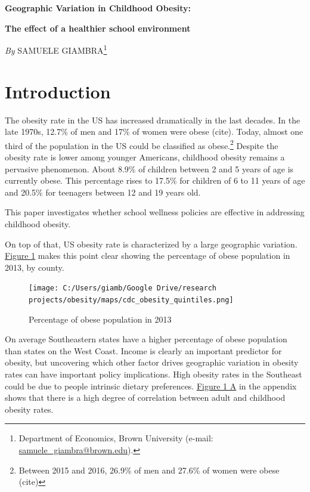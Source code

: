 \documentclass[twoside,12pt]{article}
\renewcommand*{\thefootnote}{\fnsymbol{footnote}}		%
\begin{document}
\thispagestyle{firststyle}

\centerline{\Large{\textbf{Geographic Variation in Childhood Obesity:}}} 
\vspace{2mm}
\centerline{\large{\textbf{The effect of a healthier school environment}}} 

\vspace{5mm}

\centerline{\textit{By} SAMUELE GIAMBRA\footnote{Department of Economics, Brown University (e-mail: \href{mailto:samuele_giambra@brown.edu}{samuele\_giambra@brown.edu}).}} 


\vspace{8mm}
\renewcommand*{\thefootnote}{\arabic{footnote}}		%
\setcounter{footnote}{0}




\section{Introduction}
The obesity rate in the US has increased dramatically in the last decades. In the late 1970s, 12.7\% of men and 17\% of women were obese (cite). Today, almost one third of the population in the US could be classified as obese.\footnote{Between 2015 and 2016, 26.9\% of men and 27.6\% of women were obese (cite)} Despite the obesity rate is lower among younger Americans, childhood obesity remains a pervasive phenomenon. About 8.9\% of children between 2 and 5 years of age is currently obese. This percentage rises to 17.5\% for children of 6 to 11 years of age and 20.5\% for teenagers between 12 and 19 years old.  

This paper investigates whether school wellness policies are effective in addressing childhood obesity. 


On top of that, US obesity rate is characterized by a large geographic variation. \hyperref[cdc_obesity]{Figure 1} makes this point clear showing the percentage of obese population in 2013, by county.
\begin{figure}[htp]
  \centering
  \label{cdc_obesity}\caption{Percentage of obese population in 2013}
  \texttt{[image: C:/Users/giamb/Google Drive/research projects/obesity/maps/cdc\_obesity\_quintiles.png]}
\end{figure}
On average Southeastern states have a higher percentage of obese population than states on the West Coast. Income is clearly an important predictor for obesity, but uncovering which other factor drives geographic variation in obesity rates can have important policy implications. High obesity rates in the Southeast could be due to people intrinsic dietary preferences. \hyperref[adult_childhood_comparison]{Figure 1 A} in the appendix shows that there is a high degree of correlation between adult and childhood obesity rates.
\end{document}
